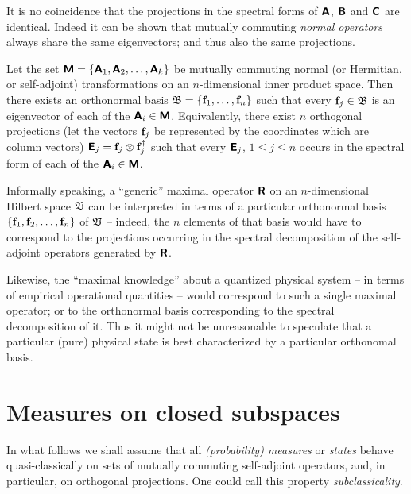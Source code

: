 It is no coincidence that the projections in the spectral forms of
$\textsf{\textbf{A}}$,
$\textsf{\textbf{B}}$  and
$\textsf{\textbf{C}}$ are identical.
Indeed it can be shown that mutually commuting {\em normal operators} always share the same eigenvectors; and thus also the same projections.

Let the set $\textsf{\textbf{M}}
=
\{
\textsf{\textbf{A}}_1,
\textsf{\textbf{A}}_2,
\ldots ,
\textsf{\textbf{A}}_k
\}
$
be mutually commuting  normal (or Hermitian, or self-adjoint) transformations on an $n$-dimensional inner product space.
Then there exists an orthonormal basis
${\frak B}= \{
{\bf f}_1,
\ldots ,
{\bf f}_n\}$
such that every ${\bf f}_j \in {\frak B}$  is an eigenvector  of each of the $\textsf{\textbf{A}}_i \in  \textsf{\textbf{M}}$.
Equivalently, there exist $n$ orthogonal projections  (let the vectors ${\bf f}_j$ be represented by the coordinates which are column vectors)
$\textsf{\textbf{E}}_j= {\bf f}_j\otimes {\bf f}_j^\dagger$
such that every $\textsf{\textbf{E}}_j$, $1\le j\le n$ occurs in the spectral form of each of the $\textsf{\textbf{A}}_i \in  \textsf{\textbf{M}}$.


Informally speaking,
a ``generic'' maximal operator $\textsf{\textbf{R}}$ on an $n$-dimensional Hilbert space ${\frak V}$
can be interpreted in terms of a particular orthonormal basis
$\{{\bf f}_1,{\bf f}_2,\ldots ,{\bf f}_n\}$ of ${\frak V}$
-- indeed, the $n$ elements of that basis would have to correspond to the projections occurring
in the spectral decomposition of the self-adjoint operators
generated by $\textsf{\textbf{R}}$.

{\color{Purple}
Likewise, the ``maximal knowledge'' about a quantized physical system -- in terms of empirical operational quantities --
would correspond to such a single maximal operator;
or to the orthonormal basis corresponding to the spectral decomposition of it.
Thus it might not be unreasonable to speculate that a particular (pure) physical state is best characterized by a particular orthonomal basis.
}


\section{Measures on closed subspaces}

In what follows we shall assume that all {\em (probability) measures}
or {\em states}
behave quasi-classically on sets of mutually commuting self-adjoint operators,
and, in particular, on orthogonal projections. One could call this property {\em subclassicality}.

